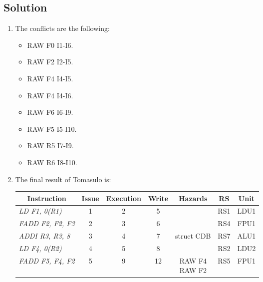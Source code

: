 \subsection*{Solution}
\begin{enumerate}
    \item The conflicts are the following: 
        \begin{itemize}
            \item RAW F0 I1-I6.
            \item RAW F2 I2-I5.
            \item RAW F4 I4-I5.
            \item RAW F4 I4-I6.
            \item RAW F6 I6-I9.
            \item RAW F5 I5-I10.
            \item RAW R5 I7-I9.
            \item RAW R6 I8-I10.
        \end{itemize}
    \item The final result of Tomasulo is: 
        \begin{table}[H]
            \centering
            \begin{tabular}{l|ccc|ccc}
            \multicolumn{1}{c|}{\textbf{Instruction}} & \textbf{Issue} & \textbf{Execution} & \textbf{Write} & \textbf{Hazards}                & \textbf{RS} & \textbf{Unit} \\ \hline
            \textit{LD F1, 0(R1)}                     & 1              & 2                  & 5              &                                 & RS1         & LDU1          \\
            \textit{FADD F2, F2, F3}                  & 2              & 3                  & 6              &                                 & RS4         & FPU1          \\
            \textit{ADDI R3, R3, 8}                   & 3              & 4                  & 7              & struct CDB                      & RS7         & ALU1          \\
            \textit{LD F4, 0(R2)}                     & 4              & 5                  & 8              &                                 & RS2         & LDU2          \\
            \textit{FADD F5, F4, F2}                  & 5              & 9                  & 12             & \makecell{RAW F4 \\ RAW F2}     & RS5         & FPU1          \\

\end{tabular}
\end{table}
\end{enumerate}
